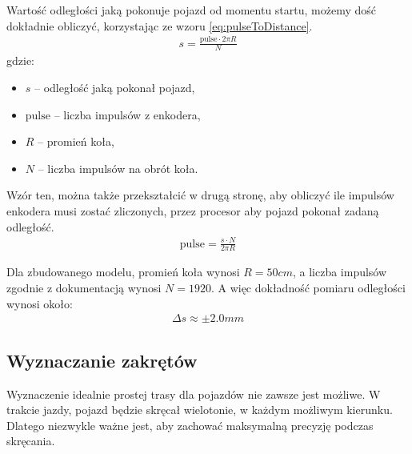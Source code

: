         Wartość odległości jaką pokonuje pojazd od momentu startu, możemy dość dokładnie obliczyć, korzystając ze wzoru \eqref{eq:pulseToDistance}.
        \begin{gather}
            s = \frac{\text{pulse} \cdot 2\pi R}{N}
            \label{eq:pulseToDistance}
        \end{gather}
        gdzie:
        \begin{itemize}
            \item $s$ -- odległość jaką pokonał pojazd,
            \item $\text{pulse}$ -- liczba impulsów z enkodera,
            \item $R$ -- promień koła,
            \item $N$ -- liczba impulsów na obrót koła.
        \end{itemize}

        Wzór ten, można także przekształcić w drugą stronę, aby obliczyć ile impulsów enkodera musi zostać zliczonych, przez procesor aby pojazd pokonał zadaną odległość.
        \begin{gather}
            \text{pulse} = \frac{s \cdot N}{2\pi R}
            \label{eq:distanceToPulse}
        \end{gather}

        Dla zbudowanego modelu, promień koła wynosi $R = 50cm$, a liczba impulsów zgodnie z dokumentacją wynosi $N = 1920$.
        A więc dokładność pomiaru odległości wynosi około:
        \begin{gather}
            \Delta s \approx \pm2.0mm
        \end{gather}


    \subsection{Wyznaczanie zakrętów}
        Wyznaczenie idealnie prostej trasy dla pojazdów nie zawsze jest możliwe.
        W trakcie jazdy, pojazd będzie skręcał wielotonie, w każdym możliwym kierunku.
        Dlatego niezwykle ważne jest, aby zachować maksymalną precyzję podczas skręcania.

